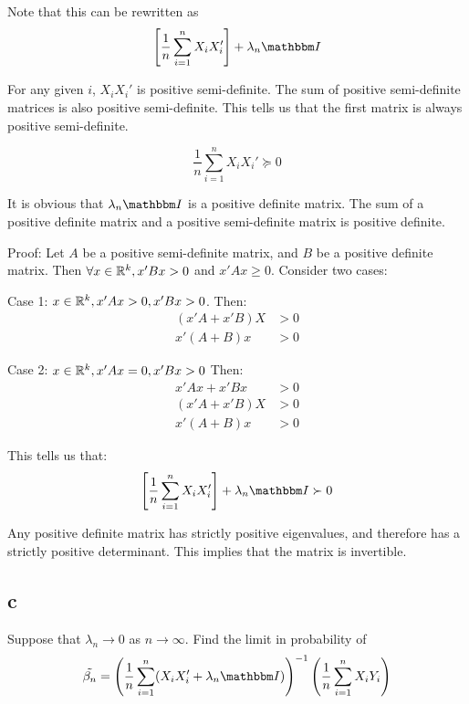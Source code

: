 \documentclass[12pt]{paper}
\begin{document}
Note that this can be rewritten as
\begin{equation*}
  \brak{\frac{1}{n} \sum_{i=1}^n  X_i X_i'} + \lambda_n \eye 
\end{equation*}

For any given $i$, $X_i X_i'$ is positive semi-definite. The sum of
positive semi-definite matrices is also positive semi-definite. This
tells us that the first matrix is always positive semi-definite.

\begin{equation*}
  \frac{1}{n} \sum_{i=1}^n  X_i X_i' \succeq 0
\end{equation*}

It is obvious that $\lambda_n \eye$ is a positive definite matrix. The sum
of a positive definite matrix and a positive semi-definite matrix is
positive definite.

Proof: Let $A$ be a positive semi-definite matrix, and $B$ be a
positive definite matrix. Then $\forall x \in \mathbb{R}^k, x' B x > 0$ and $x' A x
\geq 0$. Consider two cases:

Case 1: $x \in \mathbb{R}^k, x' A x > 0, x' B x > 0$. Then:
\begin{align*}
  \left( x' A + x' B \right) X &> 0\\
  x' ( A + B ) x &> 0
\end{align*}

Case 2: $x \in \mathbb{R}^k, x' A x = 0, x' B x > 0$ Then:
\begin{align*}
  x' A x + x' B x &> 0\\
  \left( x' A + x' B \right) X &> 0\\
  x' ( A + B ) x &> 0
\end{align*}

This tells us that:
\begin{equation*}
  \brak{\frac{1}{n} \sum_{i=1}^n  X_i X_i'} + \lambda_n \eye \succ 0
\end{equation*}

Any positive definite matrix has strictly positive eigenvalues, and
therefore has a strictly positive determinant. This implies that the
matrix is invertible.

\subsection*{c}

Suppose that $\lambda_n \rightarrow 0$ as $n \rightarrow \infty$. Find the limit in probability of
\begin{equation*}
  \tilde{\beta_n} = \inv{ \left( \frac{1}{n} \sum_{i=1}^n ( X_i X_i' + \lambda_n
      \eye) \right)} \left( \frac{1}{n} \sum_{i=1}^n X_i Y_i \right)
\end{equation*}
\end{document}

